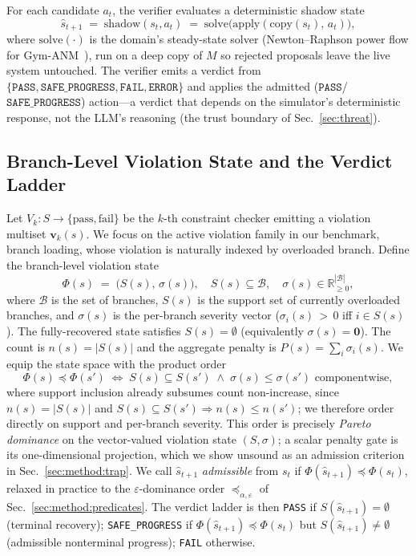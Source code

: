For each candidate $a_t$, the verifier evaluates a deterministic shadow state
\begin{equation}
\hat{s}_{t+1} \;=\; \mathrm{shadow}(s_t,a_t)\;=\;\mathrm{solve}\bigl(\mathrm{apply}(\mathrm{copy}(s_t),\,a_t)\bigr),
\end{equation}
where $\mathrm{solve}(\cdot)$ is the domain's steady-state solver (Newton--Raphson power flow for Gym-ANM~\cite{henry2021gymanm}), run on a deep copy of $M$ so rejected proposals leave the live system untouched. The verifier emits a verdict from $\{\texttt{PASS}, \texttt{SAFE\_PROGRESS}, \texttt{FAIL}, \texttt{ERROR}\}$ and applies the admitted ($\texttt{PASS}$/$\texttt{SAFE\_PROGRESS}$) action---a verdict that depends on the simulator's deterministic response, not the LLM's reasoning (the trust boundary of Sec.~\ref{sec:threat}).

\subsection{Branch-Level Violation State and the Verdict Ladder}
\label{sec:method:state}

Let $V_k:S\to\{\text{pass},\text{fail}\}$ be the $k$-th constraint checker emitting a violation multiset $\mathbf{v}_k(s)$. We focus on the active violation family in our benchmark, branch loading, whose violation is naturally indexed by overloaded branch. Define the branch-level violation state
\begin{equation}
\Phi(s) \;=\; \bigl(S(s),\,\sigma(s)\bigr),
\quad
S(s)\subseteq\mathcal{B},
\quad
\sigma(s)\in\mathbb{R}_{\ge 0}^{|\mathcal{B}|},
\label{eq:phi}
\end{equation}
where $\mathcal{B}$ is the set of branches, $S(s)$ is the support set of currently overloaded branches, and $\sigma(s)$ is the per-branch severity vector ($\sigma_i(s)\,{>}\,0$ iff $i\in S(s)$). The fully-recovered state satisfies $S(s)=\emptyset$ (equivalently $\sigma(s)=\mathbf{0}$). The count is $n(s)=|S(s)|$ and the aggregate penalty is $P(s)=\sum_i\sigma_i(s)$. We equip the state space with the product order
\begin{equation}
\Phi(s)\preceq\Phi(s')
\;\iff\;
S(s)\subseteq S(s')
\;\wedge\;
\sigma(s)\le\sigma(s')\text{ componentwise},
\end{equation}
where support inclusion already subsumes count non-increase, since $n(s)=|S(s)|$ and $S(s)\subseteq S(s')\Rightarrow n(s)\le n(s')$; we therefore order directly on support and per-branch severity. This order is precisely \emph{Pareto dominance} on the vector-valued violation state $(S,\sigma)$; a scalar penalty gate is its one-dimensional projection, which we show unsound as an admission criterion in Sec.~\ref{sec:method:trap}. We call $\hat{s}_{t+1}$ \emph{admissible} from $s_t$ if $\Phi(\hat{s}_{t+1})\preceq\Phi(s_t)$, relaxed in practice to the $\varepsilon$-dominance order $\preceq_{\alpha,\varepsilon}$ of Sec.~\ref{sec:method:predicates}. The verdict ladder is then
\texttt{PASS} if $S(\hat{s}_{t+1})=\emptyset$ (terminal recovery); \texttt{SAFE\_PROGRESS} if $\Phi(\hat{s}_{t+1})\preceq\Phi(s_t)$ but $S(\hat{s}_{t+1})\ne\emptyset$ (admissible nonterminal progress); \texttt{FAIL} otherwise.


